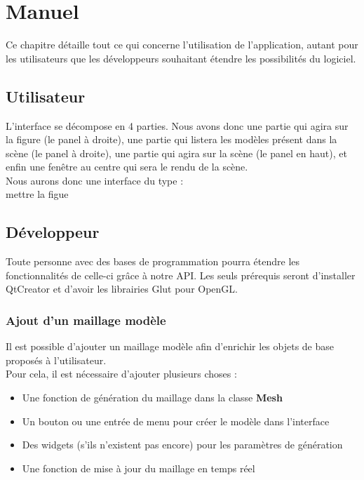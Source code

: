 \documentclass[a4paper]{memoir}
\begin{document}
	\chapter{Manuel}
		Ce chapitre détaille tout ce qui concerne l'utilisation de l'application, autant pour les utilisateurs que les développeurs souhaitant étendre les 
		possibilités du logiciel.
		
		\section{Utilisateur}

			L'interface se d\'ecompose en 4 parties. Nous avons donc une partie qui agira sur la figure (le panel \`a droite), une partie qui listera les mod\`eles  pr\'esent dans la sc\`ene (le panel \`a droite), une partie qui agira sur la sc\`ene (le panel en haut), et enfin une fen\^etre au centre qui sera le rendu de la sc\`ene.\\
			Nous aurons donc une interface du type :\\ mettre la figue 
			



		\section{Développeur}
			Toute personne avec des bases de programmation pourra étendre les fonctionnalités de celle-ci grâce à notre API. Les seuls prérequis seront 
			d'installer QtCreator et d'avoir les librairies Glut pour OpenGL.
			
			\subsection{Ajout d'un maillage modèle}
				Il est possible d'ajouter un maillage modèle afin d'enrichir les objets de base proposés à l'utilisateur.\\
				Pour cela, il est nécessaire d'ajouter plusieurs choses :
				\begin{itemize}
					\item Une fonction de génération du maillage dans la classe \textbf{Mesh}
					\item Un bouton ou une entrée de menu pour créer le modèle dans l'interface
					\item Des widgets (s'ils n'existent pas encore) pour les paramètres de génération
					\item Une fonction de mise à jour du maillage en temps réel
				\end{itemize}
				
\end{document}
